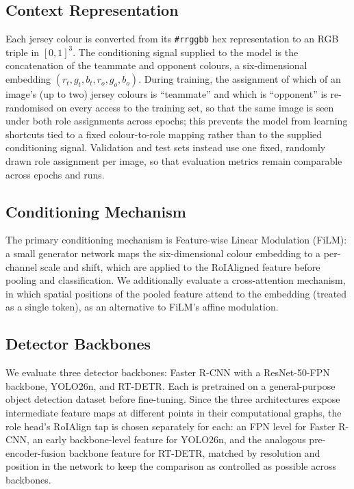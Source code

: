 \documentclass{article}
\begin{document}
\subsection{Context Representation}

Each jersey colour is converted from its \texttt{\#rrggbb} hex representation to an RGB triple in $[0,1]^3$. The conditioning signal supplied to the model is the concatenation of the teammate and opponent colours, a six-dimensional embedding $(r_t, g_t, b_t, r_o, g_o, b_o)$. During training, the assignment of which of an image's (up to two) jersey colours is ``teammate'' and which is ``opponent'' is re-randomised on every access to the training set, so that the same image is seen under both role assignments across epochs; this prevents the model from learning shortcuts tied to a fixed colour-to-role mapping rather than to the supplied conditioning signal. Validation and test sets instead use one fixed, randomly drawn role assignment per image, so that evaluation metrics remain comparable across epochs and runs.

\subsection{Conditioning Mechanism}
\label{sec:conditioning}

The primary conditioning mechanism is Feature-wise Linear Modulation (FiLM): a small generator network maps the six-dimensional colour embedding to a per-channel scale and shift, which are applied to the RoIAligned feature before pooling and classification. We additionally evaluate a cross-attention mechanism, in which spatial positions of the pooled feature attend to the embedding (treated as a single token), as an alternative to FiLM's affine modulation.

\subsection{Detector Backbones}

We evaluate three detector backbones: Faster R-CNN with a ResNet-50-FPN backbone, YOLO26n, and RT-DETR. Each is pretrained on a general-purpose object detection dataset before fine-tuning. Since the three architectures expose intermediate feature maps at different points in their computational graphs, the role head's RoIAlign tap is chosen separately for each: an FPN level for Faster R-CNN, an early backbone-level feature for YOLO26n, and the analogous pre-encoder-fusion backbone feature for RT-DETR, matched by resolution and position in the network to keep the comparison as controlled as possible across backbones.
\end{document}

